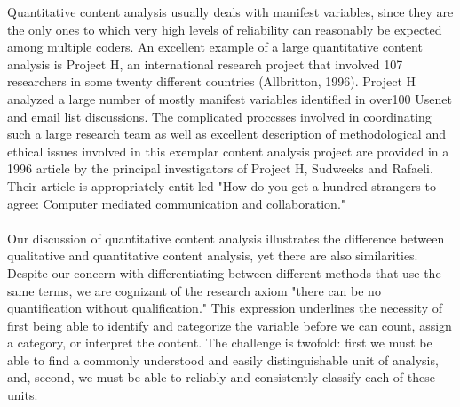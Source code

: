 \begin{quote}
\footnotesize
\end{quote}

Quantitative content analysis usually deals with manifest variables, since they are the only ones to which very high levels of reliability can reasonably be expected among multiple coders. An excellent example of a large quantitative content analysis is Project H, an international research project that involved 107 researchers in some twenty different countries (Allbritton, 1996). Project H analyzed a large number of mostly man­ifest variables identified in over100 Usenet and email list discussions. The complicated proccsses involved in coordinating such a large research team as well as excellent description of methodological and ethical issues involved in this exemplar content analysis project are provided in a 1996 article by the principal investigators of Project H, Sudweeks and Rafaeli. Their article is appropriately entit led "How do you get a hundred strangers to agree: Computer mediated communication and collaboration."\\

\\

\noindent Our discussion of quantitative content analysis illustrates the difference between qualitative and quantitative content analysis, yet there are also similarities. Despite our con­cern with differentiating between different methods that use the same terms, we are cognizant of the research axiom "there can be no quantification without qualification." This expression underlines the necessity of first being able to identify and categorize the variable before we can count, assign a category, or interpret the content. The chal­lenge is twofold: first we must be able to find a commonly understood and easily dis­tinguishable unit of analysis, and, second, we must be able to reliably and consistently classify each of these units.\\


